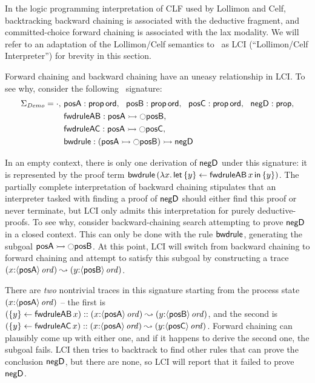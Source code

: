 In the logic programming interpretation of CLF used by Lollimon and
Celf, backtracking backward chaining is associated with the deductive
fragment, and committed-choice forward chaining is associated with the
lax modality. We will refer to an adaptation of the Lollimon/Celf
semantics to \sls~as LCI (``Lollimon/Celf Interpreter'') for
brevity in this section.

Forward chaining and backward chaining have an uneasy relationship in
LCI. To see why, consider the following \sls~signature:
\begin{align*}
 \Sigma_{\it Demo} = \cdot, 
~&{\sf posA} : {\sf prop}\,{\sf ord}, 
~~{\sf posB} : {\sf prop}\,{\sf ord}, 
~~{\sf posC} : {\sf prop}\,{\sf ord}, 
~~{\sf negD} : {\sf prop},\\
~&{\sf fwdruleAB} : {\sf posA} \rightarrowtail {\ocircle}{\sf posB},\\
~&{\sf fwdruleAC} : {\sf posA} \rightarrowtail {\ocircle}{\sf posC},\\
~&{\sf bwdrule} : ({\sf posA} \rightarrowtail {\ocircle}{\sf posB}) \rightarrowtail {\sf negD}
\end{align*}

In an empty context, there is only one derivation of ${\sf negD}$
under this signature: it is represented by the proof term ${\sf
  bwdrule}\,(\lambda x.\,{\sf let}\,{\{{y}\} \leftarrow {{\sf
      fwdruleAB}\,x}}\,{\sf in}\,\{ {y} \})$. The partially complete interpretation of
backward chaining stipulates that an interpreter tasked with finding a
proof of ${\sf negD}$ should either find this proof or never
terminate, but LCI only admits this interpretation for purely
deductive-proofs. To see why, consider backward-chaining search
attempting to prove ${\sf negD}$ in a closed context.  This can only
be done with the rule ${\sf bwdrule}$, generating the subgoal ${\sf
  posA} \rightarrowtail {\ocircle}{\sf posB}$.  At this point, LCI will switch
from backward chaining to forward chaining and attempt to satisfy this
subgoal by constructing a trace $(x{:}{\langle {\sf posA} \rangle}\,{{\it ord}})
\leadsto (y{:}{\langle {\sf posB} \rangle}\,{{\it ord}})$.

There are {\it two} nontrivial traces in this signature starting from
the process state $(x{:}{\langle {\sf posA} \rangle}\,{{\it ord}})$ -- the first is
$(\{{y}\} \leftarrow {{\sf fwdruleAB}\,x}) :: (x{:}{\langle {\sf posA} \rangle}\,{{\it ord}})
\leadsto (y{:}{\langle {\sf posB} \rangle}\,{{\it ord}})$, and the second is
$(\{{y}\} \leftarrow {{\sf fwdruleAC}\,x})::(x{:}{\langle {\sf posA} \rangle}\,{{\it ord}})
\leadsto (y{:}{\langle {\sf posC} \rangle}\,{{\it ord}})$.  Forward chaining can
plausibly come up with either one, and if it happens to derive the
second one, the subgoal fails. LCI then tries to backtrack to find
other rules that can prove the conclusion ${\sf negD}$, but there are
none, so LCI will report that it failed to prove ${\sf negD}$.

